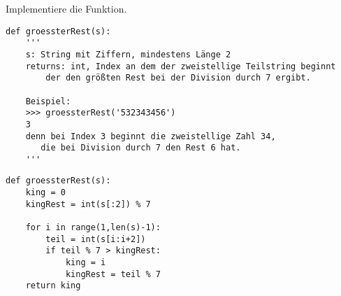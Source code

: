 \question[5]  Implementiere die Funktion.

\begin{lstlisting}
def groessterRest(s):
    '''
    s: String mit Ziffern, mindestens Länge 2
    returns: int, Index an dem der zweistellige Teilstring beginnt
        der den größten Rest bei der Division durch 7 ergibt.

    Beispiel:
    >>> groessterRest('532343456')
    3
    denn bei Index 3 beginnt die zweistellige Zahl 34,
       die bei Division durch 7 den Rest 6 hat.
    '''
\end{lstlisting}
\begin{solutionbox}{10cm}
\begin{lstlisting}
def groessterRest(s):
    king = 0
    kingRest = int(s[:2]) % 7

    for i in range(1,len(s)-1):
        teil = int(s[i:i+2])
        if teil % 7 > kingRest:
            king = i
            kingRest = teil % 7
    return king
\end{lstlisting}
\end{solutionbox}
